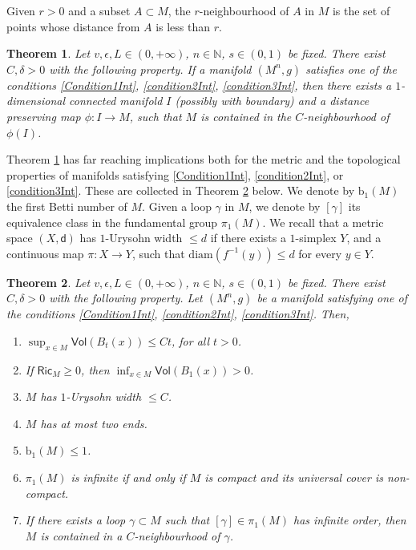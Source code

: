 \documentclass[10pt]{article}
\newtheorem{thm}{Theorem}[section]
\theoremstyle{definition}
\newcommand{\bb}[1]{\mathbb{#1}}
\newcommand{\ssf}[1]{\mathsf{#1}}
\newcommand{\Ric}{\mathsf{Ric}}
\newcommand{\sd}{\mathsf{d}}
\begin{document}
Given $r>0$ and a subset $A \subset M$, the $r$-neighbourhood of $A$ in $M$ is the set of points whose distance from $A$ is less than $r$.

\begin{thm} \label{thmIntMain}
Let $v,\epsilon,L \in (0,+\infty)$, $n \in \bb{N}$, $s \in (0,1)$ be fixed.
    There exist $C,\delta>0$ with the following property. If a manifold $(M^n,g)$ satisfies one of the conditions \ref{Condition1Int}, \ref{condition2Int}, \ref{condition3Int}, then
    there exists a $1$-dimensional connected manifold $I$ (possibly with boundary) and a distance preserving map $\phi:I \to M$, such that $M$ is contained in the $C$-neighbourhood of $\phi(I)$.
    \end{thm}

Theorem \ref{thmIntMain} has far reaching implications both for the metric and the topological properties of manifolds satisfying \ref{Condition1Int}, \ref{condition2Int}, or \ref{condition3Int}. These are collected in Theorem \ref{thmInt2} below.
We denote by $\mathrm{b}_1(M)$ the first Betti number of $M$.
Given a loop $\gamma$ in $M$, we denote by $[\gamma]$ its equivalence class in the fundamental group $\pi_1(M)$. We recall that a metric space $(X,\sd)$ has $1$-Urysohn width $\leq d$ if there exists a $1$-simplex $Y$, and a continuous map $\pi:X \to Y$, such that $\mathrm{diam}(f^{-1}(y)) \leq d$ for every $y \in Y$.

\begin{thm} \label{thmInt2}
    Let $v,\epsilon,L \in (0,+\infty)$, $n \in \bb{N}$, $s \in (0,1)$ be fixed.
    There exist $C,\delta>0$ with the following property. Let $(M^n,g)$ be a manifold satisfying one of the conditions \ref{Condition1Int}, \ref{condition2Int}, \ref{condition3Int}. Then, 
    \begin{enumerate}
    \item \label{point1}
        $\sup_{x \in M} \ssf{Vol}(B_t(x)) \leq Ct$, for all $t>0$.
       \item \label{point2}
       If $\Ric_M \geq 0$, then $\inf_{x \in M} \ssf{Vol}(B_1(x))>0$.
       \item $M$ has $1$-Urysohn width $\leq C$.
       \item $M$ has at most two ends.
    	\item $\mathrm{b}_1(M) \leq 1$.
    	\item $\pi_1(M)$ is infinite if and only if $M$ is compact and its universal cover is non-compact.
    	\item If there exists a loop $\gamma \subset M$ such that $[\gamma] \in \pi_1(M)$ has infinite order, then $M$ is contained in a $C$-neighbourhood of $\gamma$.
       \end{enumerate}
       \end{thm}
\end{document}
